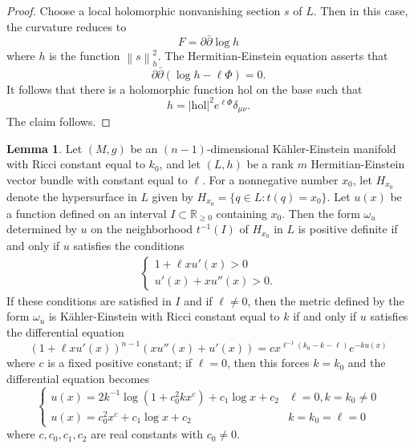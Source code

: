 \documentclass{article}
\numberwithin{equation}{section}
\theoremstyle{definition}
\theoremstyle{theorem}
\newtheorem{lemma}[definition]{Lemma}
\newcommand{\norm}[1]{\left\lVert#1\right\rVert}
\newcommand{\ddb}{\partial\bar{\partial}}
\begin{document}
\begin{proof}
Choose a local holomorphic nonvanishing section $s$ of $L$. Then in this case, the curvature reduces to 
\[
F = \ddb \log h
\] 
where $h$ is the function $\norm{s}_{h}^2$. 
The Hermitian-Einstein equation asserts that 
\[
\ddb (\log h - \ell \Phi ) = 0.
\]
It follows that there is a holomorphic function $\text{hol}$ on the base such that 
\[
h = |\text{hol}|^2 e^{\ell \Phi} \delta_{\mu \nu}. 
\]
The claim follows. 
\end{proof}

\begin{lemma}
Let $(M,g)$ be an $(n - 1)$-dimensional K\"ahler-Einstein manifold with Ricci constant equal to $k_0$, and let $(L,h)$ be a rank $m$ Hermitian-Einstein vector bundle with constant equal to $\ell$. For a nonnegative number $x_0$, let $H_{x_0}$ denote the hypersurface in $L$ given by $H_{x_0} = \{ q \in L : t(q) = x_0\}$. Let $u(x)$ be a function defined on an interval $I \subset \mathbb{R}_{\geqslant 0}$ containing $x_0$. Then the form $\omega_u$ determined by $u$ on the neighborhood $t^{-1}(I)$ of $H_{x_0}$ in $L$ is positive definite if and only if $u$ satisfies the conditions 
\begin{align*}
\begin{cases}
1 + \ell x u'(x) > 0 \\
u'(x) + x u''(x) > 0.
\end{cases}
\end{align*}
If these conditions are satisfied in $I$ and if $\ell \ne 0$, then the metric defined by the form $\omega_u$ is K\"ahler-Einstein with Ricci constant equal to $k$ if and only if $u$ satisfies the differential equation 
\[
(1 + \ell x u'(x))^{n-1} (x u''(x) + u'(x)) = c x^{\ell^{-1}(k_0 - k - \ell)}e^{-k u(x)}
\]
where $c$ is a fixed positive constant; if $\ell = 0$, then this forces $k = k_0$ and the differential equation becomes 
\[
\begin{cases}
u(x) = 2k^{-1} \log(1 + c_0^2 k x^c) + c_1 \log x + c_2 & \ell = 0, k = k_0 \ne 0 \\
u(x) = c_0^2 x^c + c_1 \log x + c_2 & k = k_0 = \ell = 0
\end{cases}
\]
where $c, c_0, c_1, c_2$ are real constants with $c_0 \ne 0$. 
\end{lemma}
\end{document}
